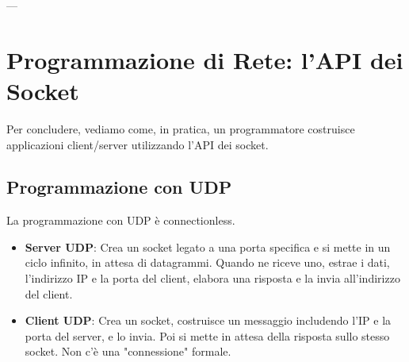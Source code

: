 
---

\section{Programmazione di Rete: l'API dei Socket}
Per concludere, vediamo come, in pratica, un programmatore costruisce applicazioni client/server utilizzando l'API dei socket.

\subsection{Programmazione con UDP}
La programmazione con UDP è connectionless.
\begin{itemize}
    \item \textbf{Server UDP}: Crea un socket legato a una porta specifica e si mette in un ciclo infinito, in attesa di datagrammi. Quando ne riceve uno, estrae i dati, l'indirizzo IP e la porta del client, elabora una risposta e la invia all'indirizzo del client.
    \item \textbf{Client UDP}: Crea un socket, costruisce un messaggio includendo l'IP e la porta del server, e lo invia. Poi si mette in attesa della risposta sullo stesso socket. Non c'è una "connessione" formale.
\end{itemize}

